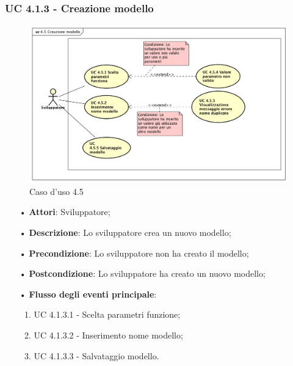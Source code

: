 \subsubsection{UC 4.1.3 - Creazione modello}
\begin{figure}[H]
\centering
\includegraphics[width=17cm]{img/UC450.png} 
\caption{Caso d'uso 4.5}\label{fig:450}
\end{figure}
\begin{itemize}
\item[•]\textbf{Attori}: Sviluppatore;
\item[•]\textbf{Descrizione}: Lo sviluppatore crea un nuovo modello;
\item[•]\textbf{Precondizione}: Lo sviluppatore non ha creato il modello;
\item[•]\textbf{Postcondizione}: Lo sviluppatore ha creato un nuovo modello;
\item[•]\textbf{Flusso degli eventi principale}:  
\begin{enumerate}
	\item UC 4.1.3.1 - Scelta parametri funzione;
	\item UC 4.1.3.2 - Inserimento nome modello;
	\item UC 4.1.3.3 - Salvataggio modello.
\end{enumerate}
\end{itemize}

